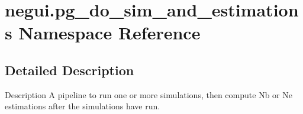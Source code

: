 \hypertarget{namespacenegui_1_1pg__do__sim__and__estimations}{}\section{negui.\+pg\+\_\+do\+\_\+sim\+\_\+and\+\_\+estimations Namespace Reference}
\label{namespacenegui_1_1pg__do__sim__and__estimations}


\subsection{Detailed Description}
\begin{DoxyVerb}Description
A pipeline to run one or more simulations, then
compute Nb or Ne estimations after the simulations
have run.
\end{DoxyVerb}
 